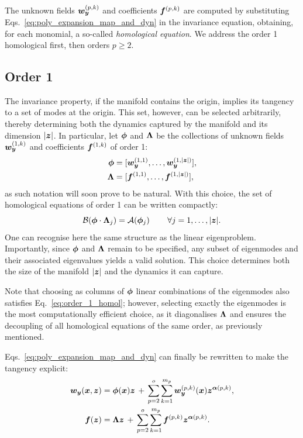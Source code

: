 \documentclass[%
reprint,
superscriptaddress,
 amsmath,amssymb,
 aps,
 pre
]{revtex4-2}
\begin{document}
The unknown fields $\boldsymbol{w}_{\boldsymbol{y}}^{(p,k)}$ and coefficients $\boldsymbol{f}^{(p,k)}$ are computed by substituting Eqs.~\eqref{eq:poly_expansion_map_and_dyn} in the invariance equation, obtaining, for each monomial, a so-called \textit{homological equation}.
We address the order 1 homological first, then orders $p \geq 2$.

%
\subsection{Order 1}\label{subsec:order1_homol}

The invariance property, if the manifold contains the origin, implies its tangency to a set of modes at the origin. This set, however, can be selected arbitrarily, thereby determining both the dynamics captured by the manifold and its dimension $|{\boldsymbol{z}}|$.
In particular, let $\boldsymbol{\phi}$ and $\boldsymbol{\Lambda}$ be the collections of unknown fields $\boldsymbol{w}_{\boldsymbol{y}}^{(1,k)}$ and coefficients $\boldsymbol{f}^{(1,k)}$ of order 1:
\begin{align}
\boldsymbol{\phi} &= [\boldsymbol{w}_{\boldsymbol{y}}^{(1,1)}, \ldots, \boldsymbol{w}_{\boldsymbol{y}}^{(1,|{\boldsymbol{z}}|)}],\\
\label{eq:Lambda}
\boldsymbol{\Lambda} &=[\boldsymbol{f}^{(1,1)},\ldots,\boldsymbol{f}^{(1,|{\boldsymbol{z}}|)}],
\end{align}
as such notation will soon prove to be natural. With this choice, the set of homological equations of order 1 can be written compactly:
\begin{equation}
\label{eq:order_1_homol}
    \mathcal{B} (\boldsymbol{\phi} \cdot \boldsymbol{\Lambda}_{j}) = \mathcal{A} (\boldsymbol{\phi}_j)\, \qquad \forall j = 1,\ldots,|{\boldsymbol{z}}|.
\end{equation}
One can recognise here the same structure as the linear eigenproblem. Importantly, since $\boldsymbol{\phi}$ and $\boldsymbol{\Lambda}$ remain to be specified, any subset of eigenmodes and their associated eigenvalues yields a valid solution. This choice determines both the size of the manifold $|{\boldsymbol{z}}|$ and the dynamics it can capture.


Note that choosing as columns of $\boldsymbol{\phi}$ linear combinations of the eigenmodes also satisfies Eq.~\eqref{eq:order_1_homol}; however, selecting exactly the eigenmodes is the most computationally efficient choice, as it diagonalises $\boldsymbol{\Lambda}$ and ensures the decoupling of all homological equations of the same order, as previously mentioned. 

Eqs.~\eqref{eq:poly_expansion_map_and_dyn} can finally be rewritten to make the tangency explicit:
\begin{subequations}
\begin{align}
    \boldsymbol{w}_{\boldsymbol{y}}({\boldsymbol{x}},{\boldsymbol{z}}) &= \boldsymbol{\phi}({\boldsymbol{x}}) {\boldsymbol{z}} \,+\, \sum_{p=2}^o\sum_{k=1}^{m_p}\boldsymbol{w}_{\boldsymbol{y}}^{(p,k)}({\boldsymbol{x}}){\boldsymbol{z}}^{\boldsymbol{\alpha}(p,k)},\\
    \boldsymbol{f}({\boldsymbol{z}}) &= \boldsymbol{\Lambda}{\boldsymbol{z}} \,+\, \sum_{p=2}^o\sum_{k=1}^{m_p}\boldsymbol{f}^{(p,k)}{\boldsymbol{z}}^{\boldsymbol{\alpha}(p,k)}.
\end{align}
\end{subequations}
\end{document}
